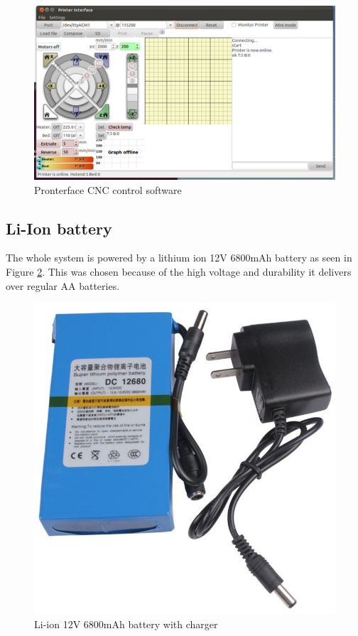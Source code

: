 			\begin{figure}[H]
					\centering
					\includegraphics[scale=1.4]{images/ProjectComponents/pronterface.png}
					\caption{Pronterface CNC control software}
					\label{battery}
			\end{figure}
			\bigskip






\subsection{Li-Ion battery}

	The whole system is powered by a lithium ion 12V 6800mAh battery as seen in Figure \ref{battery}. This was chosen because of the high voltage and durability it delivers over regular AA batteries.

		\begin{figure}[H]
				\centering
				\includegraphics[scale=0.25]{images/ProjectComponents/battery.jpg}
				\caption{Li-ion 12V 6800mAh battery with charger}
				\label{battery}
		\end{figure}
		\bigskip

